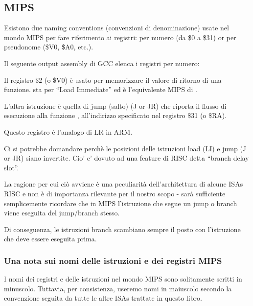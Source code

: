 \subsection{MIPS}

\label{MIPS_leaf_function_ex1}
Esistono due naming conventions (convenzioni di denominazione) usate nel mondo MIPS per fare riferimento ai registri: per numero (da \$0 a \$31) or per pseudonome (\$V0, \$A0, etc.).

Il seguente output assembly di GCC elenca i registri per numero:



\ITAph{}



Il registro \$2 (o \$V0) è usato per memorizzare il valore di ritorno di una funzione.
 sta per ``Load Immediate'' ed è l'equivalente MIPS di \MOV.

L'altra istruzione è quella di jump (salto) (J or JR) che riporta il flusso di esecuzione alla funzione ,  all'indirizzo specificato nel registro \$31 (o \$RA).

Questo registro è l'analogo di \ac{LR} in ARM.

Ci si potrebbe domandare perchè le posizioni delle istruzioni load (LI) e jump (J or JR) siano invertite. Cio' e' dovuto ad una feature di \ac{RISC} detta ``branch delay slot''.

La ragione per cui ciò avviene è una peculiarità dell'architettura di alcune \ac{ISA}s RISC e non è di importanza rilevante per il nostro scopo - sarà sufficiente semplicemente ricordare che in MIPS l'istruzione che segue un jump o branch viene eseguita  del jump/branch stesso.

Di conseguenza, le istruzioni branch scambiano sempre il posto con l'istruzione che deve essere eseguita prima.

\subsubsection{Una nota sui nomi delle istruzioni e dei registri MIPS}

I nomi dei registri e delle istruzioni nel mondo MIPS sono solitamente scritti in minuscolo. Tuttavia, per consistenza, useremo nomi in maiuscolo secondo la convenzione seguita da tutte le altre \ac{ISA}s trattate in questo libro.


